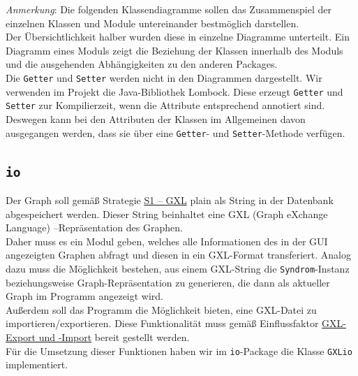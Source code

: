 \documentclass[enabledeprecatedfontcommands,fontsize=11pt,paper=a4,twoside]{scrartcl}
\newcounter{one}
\begin{document}


\textit{Anmerkung}:
Die folgenden Klassendiagramme sollen das Zusammenspiel der einzelnen Klassen und Module untereinander bestmöglich darstellen. \\
Der Übersichtlichkeit halber wurden diese in einzelne Diagramme unterteilt. Ein Diagramm eines Moduls zeigt die Beziehung der Klassen innerhalb des Moduls und die ausgehenden Abhängigkeiten zu den anderen Packages. \\
Die \texttt{Getter} und \texttt{Setter} werden nicht in den Diagrammen dargestellt. Wir verwenden im Projekt die Java-Bibliothek Lombock. Diese erzeugt \texttt{Getter} und \texttt{Setter} zur Kompilierzeit, wenn die Attribute entsprechend annotiert sind. Deswegen kann bei den Attributen der Klassen im Allgemeinen davon ausgegangen werden, dass sie über eine \texttt{Getter}- und \texttt{Setter}-Methode verfügen.\\

\subsection{\texttt{io}}
Der Graph soll gemäß Strategie \hyperlink{yy}{S1 – GXL} \glqq plain\grqq{} als String in der Datenbank abgespeichert werden. Dieser String beinhaltet eine GXL (Graph eXchange Language) –Repräsentation des Graphen.\\
Daher muss es ein Modul geben, welches alle Informationen des in der GUI angezeigten Graphen abfragt und diesen in ein GXL-Format transferiert. Analog dazu muss die Möglichkeit bestehen, aus einem GXL-String die \texttt{Syndrom}-Instanz beziehungsweise Graph-Repräsentation zu generieren, die dann als aktueller Graph im Programm angezeigt wird.\\ 

Außerdem soll das Programm die Möglichkeit bieten, eine GXL-Datei zu importieren/exportieren. Diese Funktionalität muss gemäß Einflussfaktor \hyperlink{ii}{GXL- Export und -Import} bereit gestellt werden.\\ 
Für die Umsetzung dieser Funktionen haben wir im \texttt{io}-Package die Klasse \texttt{GXLio} implementiert. \\
\end{document}
